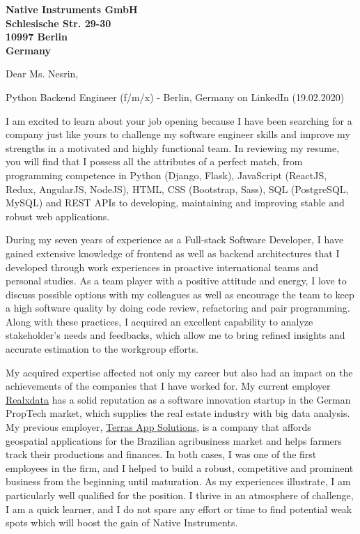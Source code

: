 \documentclass[a4paper]{joaosoares-letter}
\begin{document}
\longindentation=0pt

\begin{letter}{\bfseries Native Instruments GmbH\\Schlesische Str. 29-30\\10997 Berlin\\Germany}


\date{Berlin, \today}


\opening{Dear Ms. Nesrin,}{Python Backend Engineer (f/m/x) - Berlin, Germany on LinkedIn (19.02.2020)}

I am excited to learn about your job opening because I have been searching for a
company just like yours to challenge my software engineer skills and improve my
strengths in a motivated and highly functional team. In reviewing my resume, you will find
that I possess all the attributes of a perfect match, from programming competence in
Python (Django, Flask), JavaScript (ReactJS, Redux, AngularJS,
NodeJS), HTML, CSS (Bootstrap, Sass), SQL (PostgreSQL, MySQL) and REST APIs to
developing, maintaining and improving stable and robust web applications.

During my seven years of experience as a Full-stack Software Developer, I have gained extensive knowledge of frontend as well as backend architectures that I developed through work experiences in proactive international teams and personal studies. As a team player with a positive attitude and energy, I love to discuss possible options with my colleagues as well as encourage the team to keep a high software quality by doing code review, refactoring and pair programming. Along with these practices, I acquired an excellent capability to analyze stakeholder's needs and feedbacks, which allow me to bring refined insights and accurate estimation to the workgroup efforts.

My acquired expertise affected not only my career but also had an impact on the achievements of the companies that I have worked for. My current employer \href{https://www.realxdata.com/}{Realxdata} has a solid reputation as a software innovation startup in the German PropTech market, which supplies the real estate industry with big data analysis. My previous employer, \href{http://terras.agr.br/}{Terras App Solutions}, is a company that affords geospatial applications for the Brazilian agribusiness market and helps farmers track their productions and finances. In both cases, I was one of the first employees in the firm, and I helped to build a robust, competitive and prominent business from the beginning until maturation. As my experiences illustrate, I am particularly well qualified for the position. I thrive in an atmosphere of challenge, I am a quick learner, and I do not spare any effort or time to find potential weak spots which will boost the gain of Native Instruments.


\end{letter}
\end{document}
